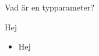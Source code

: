 
\ifkompendium\else


\begin{Slide}{Vad är en typparameter?}
\begin{multicols}{2}
Hej
\columnbreak

\begin{itemize}
\pause
\item Hej

\end{itemize}
\end{multicols}
\end{Slide}


\fi






